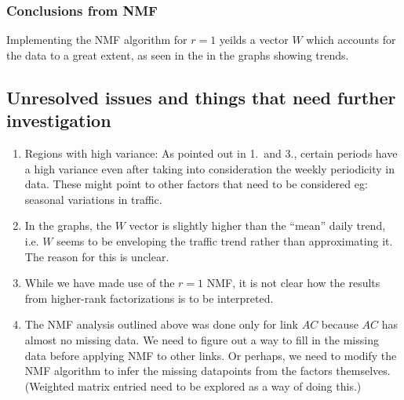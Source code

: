 \documentclass[10pt,a4paper]{amsart}
\begin{document}
\subsubsection{Conclusions from NMF}
Implementing the NMF algorithm for \(r=1\) yeilds a vector \(W\) which
accounts for the data to a great extent, as seen in the in the graphs showing
trends.

\subsection{Unresolved issues and things that need further investigation}
\begin{enumerate}
	\item Regions with high variance: As pointed out in 1.\ and 3., certain
    		periods have a high variance even after taking into consideration
    		the weekly periodicity in data. These might point to other factors
    		that need to be considered eg: seasonal variations in traffic.
    	\item In the graphs, the \(W\) vector is slightly higher than the
    		``mean'' daily trend, i.e. \(W\) seems to be enveloping the traffic
    		trend rather than approximating it. The reason for this is unclear.
    	\item While we have made use of the \(r=1\) NMF, it is not clear how the
    		results from higher-rank factorizations is to be interpreted.
    	\item The NMF analysis outlined above was done only for link \(AC\)
    		because \(AC\) has almost no missing data. We need to figure out a
    		way to fill in the missing data before applying NMF to other links.
    		Or perhaps, we need to modify the NMF algorithm to infer the missing
    		datapoints from the factors themselves. (Weighted matrix entried
    		need to be explored as a way of doing this.)
\end{enumerate}
\end{document}
